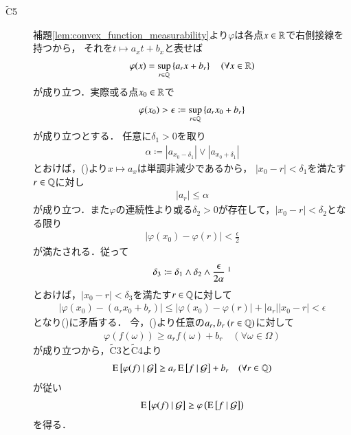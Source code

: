 \begin{prf}
\begin{description}
			\item[$\tilde{\mathrm{C}}$5]
				補題\ref{lem:convex_function_measurability}より$\varphi$は各点$x \in \mathbb{R}$で右側接線を持つから，
				それを$t \longmapsto a_x t + b_x$と表せば
				\begin{align}
					\varphi(x) = \operatorname*{sup}_{r \in \mathbb{Q}} \left\{ a_r x + b_r \right\} \quad (\forall x \in \mathbb{R})
					\label{eq:prp_properties_of_expanded_conditional_expectation_1}
				\end{align}
				が成り立つ．実際或る点$x_0 \in \mathbb{R}$で
				\begin{align}
					\varphi(x_0) > \epsilon \coloneqq \operatorname*{sup}_{r \in \mathbb{Q}} \left\{ a_r x_0 + b_r \right\}
					\label{eq:prp_properties_of_expanded_conditional_expectation_2}
				\end{align}
				が成り立つとする．
				任意に$\delta_1 > 0$を取り
				\begin{align}
					\alpha \coloneqq \left| a_{x_0 - \delta_1} \right| \vee \left| a_{x_0 + \delta_1} \right|
				\end{align}
				とおけば，()より$x \longmapsto a_x$は単調非減少であるから，
				$|x_0 - r| < \delta_1$を満たす$r \in \mathbb{Q}$に対し
				\begin{align}
					|a_r| \leq \alpha
				\end{align}
				が成り立つ．また$\varphi$の連続性より或る$\delta_2 > 0$が存在して，$|x_0 - r| < \delta_2$となる限り
				\begin{align}
					\left| \varphi(x_0) - \varphi(r) \right| < \frac{\epsilon}{2}
				\end{align}
				が満たされる．従って
				\begin{align}
					\delta_3 \coloneqq \delta_1 \wedge \delta_2 \wedge \frac{\epsilon}{2 \alpha}\ \footnotemark
				\end{align}
				とおけば，$|x_0 - r| < \delta_3$を満たす$r \in \mathbb{Q}$に対して
				\begin{align}
					\left| \varphi(x_0) - \left( a_r x_0 + b_r \right) \right| 
					\leq \left| \varphi(x_0) - \varphi(r) \right| + |a_r| \left| x_0 - r \right| < \epsilon
				\end{align}
				となり()に矛盾する．
				今，()より任意の$a_r,b_r\ (r \in \mathbb{Q})$に対して
				\begin{align}
					\varphi(f(\omega)) \geq a_r f(\omega) + b_r \quad (\forall \omega \in \Omega)
				\end{align}
				が成り立つから，$\tilde{\mathrm{C}}$3と$\tilde{\mathrm{C}}$4より
				\begin{align}
					\operatorname{E} \left[ \varphi(f) \ \middle|\ \mathcal{G} \right] \geq a_r \operatorname{E} \left[ f \ \middle|\ \mathcal{G} \right] + b_r \quad (\forall r \in \mathbb{Q})
				\end{align}
				が従い
				\begin{align}
					\operatorname{E} \left[ \varphi(f) \ \middle|\ \mathcal{G} \right] \geq \varphi\left( \operatorname{E} \left[ f \ \middle|\ \mathcal{G} \right] \right)
				\end{align}
				を得る．
				

\end{description}
\end{prf}
